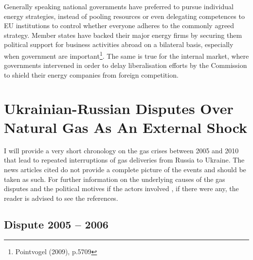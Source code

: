 \documentclass[11pt,a4paper,english]{scrreprt}
\begin{document}
Generally speaking national governments have preferred to pursue individual
energy strategies, instead of pooling resources or even delegating competences
to EU institutions to control whether everyone adheres to the commonly agreed
strategy. Member states have backed their major energy firms by securing them
political support for business activities abroad on a bilateral basis,
especially when government are important\footnote{Pointvogel (2009), p.5709}.
The same is true for the internal market, where governments intervened in order
to delay liberalisation efforts by the Commission to shield their energy
companies from foreign competition.\par



\chapter{Ukrainian-Russian Disputes Over Natural Gas As An External Shock}

I will provide a very short chronology on the gas crises between 2005 and 2010
that lead to repeated interruptions of gas deliveries from Russia to Ukraine.
The news articles cited do not provide a complete picture of the events and
should be taken as such. For further information on the underlying causes of the
gas disputes and the political motives if the actors involved , if there were
any, the reader is advised to see the references.

    \section{Dispute 2005 -- 2006}
\end{document}
